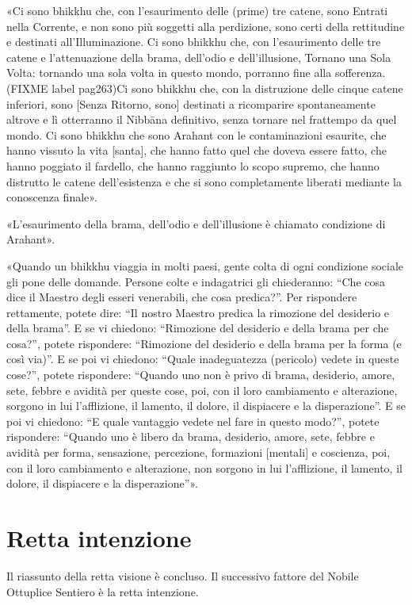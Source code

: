 «Ci sono bhikkhu che, con l’esaurimento delle (prime) tre catene, sono
Entrati nella Corrente, e non sono più soggetti alla perdizione, sono
certi della rettitudine e destinati all’Illuminazione. Ci sono bhikkhu
che, con l’esaurimento delle tre catene e l’attenuazione della brama,
dell’odio e dell’illusione, Tornano una Sola Volta: tornando una sola
volta in questo mondo, porranno fine alla sofferenza. (FIXME label pag263)Ci sono bhikkhu
che, con la distruzione delle cinque catene inferiori, sono [Senza
Ritorno, sono] destinati a ricomparire spontaneamente altrove e lì
otterranno il Nibbāna definitivo, senza tornare nel frattempo da quel
mondo. Ci sono bhikkhu che sono Arahant con le contaminazioni esaurite,
che hanno vissuto la vita [santa], che hanno fatto quel che doveva
essere fatto, che hanno poggiato il fardello, che hanno raggiunto lo
scopo supremo, che hanno distrutto le catene dell’esistenza e che si
sono completamente liberati mediante la conoscenza finale».




«L’esaurimento della brama, dell’odio e dell’illusione è chiamato
condizione di Arahant».




«Quando un bhikkhu viaggia in molti paesi, gente colta di ogni
condizione sociale gli pone delle domande. Persone colte e indagatrici
gli chiederanno: “Che cosa dice il Maestro degli esseri venerabili, che
cosa predica?”. Per rispondere rettamente, potete dire: “Il nostro
Maestro predica la rimozione del desiderio e della brama”. E se vi
chiedono: “Rimozione del desiderio e della brama per che cosa?”, potete
rispondere: “Rimozione del desiderio e della brama per la forma (e così
via)”. E se poi vi chiedono: “Quale inadeguatezza (pericolo) vedete in
queste cose?”, potete rispondere: “Quando uno non è privo di brama,
desiderio, amore, sete, febbre e avidità per queste cose, poi, con il
loro cambiamento e alterazione, sorgono in lui l’afflizione, il lamento,
il dolore, il dispiacere e la disperazione”. E se poi vi chiedono: “E
quale vantaggio vedete nel fare in questo modo?”, potete rispondere:
“Quando uno è libero da brama, desiderio, amore, sete, febbre e avidità
per forma, sensazione, percezione, formazioni [mentali] e coscienza,
poi, con il loro cambiamento e alterazione, non sorgono in lui
l’afflizione, il lamento, il dolore, il dispiacere e la disperazione”».




\hypertarget{x-retta-intenzione}{\section*{Retta intenzione}}
 Il riassunto della retta visione è concluso. Il
successivo fattore del Nobile Ottuplice Sentiero è la retta intenzione.


